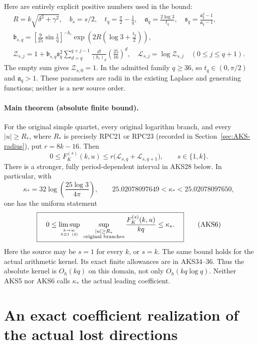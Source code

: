 \documentclass[11pt,a4paper]{article}
\begin{document}
Here are entirely explicit positive numbers used in the bound:
\[
\begin{gathered}
 R=k\sqrt{\delta^2+\gamma^2},\quad b_s=s/2,\quad
 t_q=\frac\pi2-\frac1q,\quad \mathfrak a_q=\frac{2\log3}{t_q},\quad
 \mathfrak s_q=\frac{\mathfrak a_q^q-1}{\mathfrak a_q-1},\\
 \mathfrak b_{s,q}=\left[\frac9{25}\sin\frac1q\right]^{-b_s}
       \exp\left(2R\left(\log3+\frac{t_q}{2}\right)\right),\\
 \mathcal Z_{s,j}=1+\mathfrak b_{s,q}\mathfrak s_q^2
        \sum_{d=q}^{q+j-1}\frac{d!}{(b_s)_d}
                          \left(\frac{25}{16}\right)^d,
 \quad \mathcal L_{s,j}=\log \mathcal Z_{s,j}\quad (0\le j\le q+1).
\end{gathered}\tag{AKS3}
\]
The empty sum gives $\mathcal Z_{s,0}=1$. In the admitted family $q\ge36$, so
$t_q\in(0,\pi/2)$ and $\mathfrak a_q>1$. These parameters are radii in the existing
Laplace and generating functions; neither is a new source order.

\paragraph{Main theorem (absolute finite bound).}
For the original simple quartet, every original logarithm branch, and
every $|u|\ge R_*$, where $R_*$ is precisely RPC21 or RPC23 (recorded in
Section~\ref{sec:AKS-radius}), put $r=8k-16$. Then
\[
 \boxed{\quad
 0\le F_K^{(s)}(k,u)\le r\bigl(\mathcal L_{s,q}+\mathcal L_{s,q+1}\bigr),
 \qquad s\in\{1,k\}.\quad}
 \tag{AKS4}
\]
There is a stronger, fully period-dependent interval in AKS28 below.
In particular, with
\[
 \kappa_* =32\log\left(\frac{25\log3}{4\pi}\right),
 \qquad 25.02078097649<\kappa_*<25.02078097650,
 \tag{AKS5}
\]
one has the uniform statement
\[
 \boxed{\quad
 0\le\limsup_{k\to\infty\atop k\equiv1\ (4)}
       \ \sup_{\substack{|u|\ge R_*\\\text{original branches}}}
         \frac{F_K^{(s)}(k,u)}{kq}\le\kappa_*.
 \quad}\tag{AKS6}
\]
Here the source may be $s=1$ for every $k$, or $s=k$. The same bound holds
for the actual arithmetic kernel. Its exact finite allowances are in
AKS34--36. Thus the absolute kernel is $O_h(kq)$ on this domain, not only
$O_h(kq\log q)$. Neither AKS5 nor AKS6 calls $\kappa_*$ the actual leading
coefficient.

\section{An exact coefficient realization of the actual lost directions}
\label{sec:AKS-frame}
\end{document}
